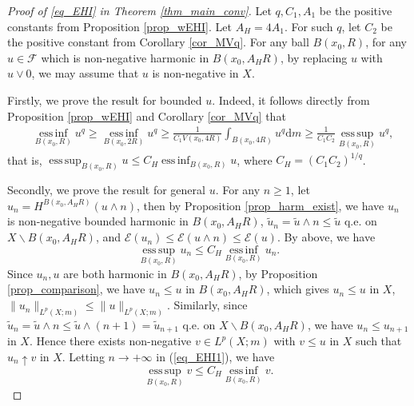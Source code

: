 \documentclass[11pt,a4paper]{article}
\numberwithin{equation}{section}
\newcommand{\esup}{\operatorname*{ess\,sup}}
\newcommand{\einf}{\operatorname*{ess\,inf}}
\theoremstyle{plain}
\theoremstyle{definition}
\begin{document}
\begin{proof}[Proof of \ref{eq_EHI} in Theorem \ref{thm_main_conv}]
Let $q,C_1,A_1$  be the positive constants from Proposition \ref{prop_wEHI}. Let $A_H=4A_1$. For such $q$, let $C_2$ be the positive constant from Corollary \ref{cor_MVq}. For any ball $B(x_0,R)$, for any $u\in\mathcal{F}$ which is non-negative harmonic in $B(x_0,A_HR)$, by replacing $u$ with $u\vee 0$, we may assume that $u$ is non-negative in $X$.

Firstly, we prove the result for bounded $u$. Indeed, it follows directly from Proposition \ref{prop_wEHI} and Corollary \ref{cor_MVq} that
\begin{align*}
&\einf_{B(x_0,R)}u^q\ge\einf_{B(x_0,2R)}u^q\ge\frac{1}{C_1V(x_0,4R)}\int_{B(x_0,4R)}u^q\mathrm{d} m\ge \frac{1}{C_1C_2}\esup_{B(x_0,R)}u^q,
\end{align*}
that is, $\esup_{B(x_0,R)}u\le C_H\einf_{B(x_0,R)}u$, where $C_H=(C_1C_2)^{1/q}$.

Secondly, we prove the result for general $u$. For any $n\ge1$, let $u_n=H^{B(x_0,A_HR)}(u\wedge n)$, then by Proposition \ref{prop_harm_exist}, we have $u_n$ is non-negative bounded harmonic in $B(x_0,A_HR)$, $\widetilde{u}_n=\widetilde{u}\wedge n\le \widetilde{u}$ q.e. on $X\backslash B(x_0,A_HR)$, and $\mathcal{E}(u_n)\le \mathcal{E}(u\wedge n)\le \mathcal{E}(u)$. By above, we have
\begin{equation}\label{eq_EHI1}
\esup_{B(x_0,R)}u_n\le C_H\einf_{B(x_0,R)}u_n.
\end{equation}
Since $u_n,u$ are both harmonic in $B(x_0,A_HR)$, by Proposition \ref{prop_comparison}, we have $u_n\le u$ in $B(x_0,A_HR)$, which gives $u_n\le u$ in $X$, $\lVert u_n\rVert_{L^p(X;m)}\le \lVert u\rVert_{L^p(X;m)}$. Similarly, since $\widetilde{u}_n=\widetilde{u}\wedge n\le\widetilde{u}\wedge (n+1)=\widetilde{u}_{n+1}$ q.e. on $X\backslash B(x_0,A_HR)$, we have $u_n\le u_{n+1}$ in $X$. Hence there exists non-negative $v\in L^p(X;m)$ with $v\le u$ in $X$ such that $u_n\uparrow v$ in $X$. Letting $n\to+\infty$ in (\ref{eq_EHI1}), we have
$$\esup_{B(x_0,R)}v\le C_H\einf_{B(x_0,R)}v.$$


\end{proof}
\end{document}
